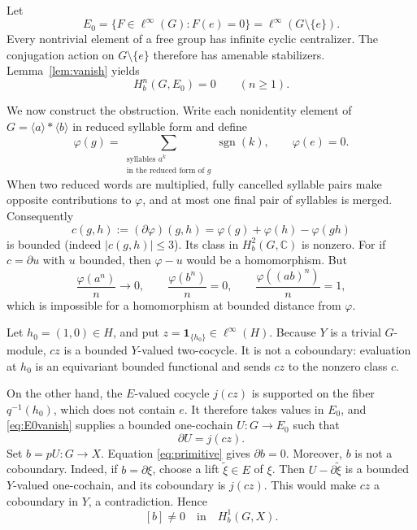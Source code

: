 \documentclass[11pt]{article}
\newcommand{\C}{\mathbb C}
\newcommand{\Hb}{H_{\!b}}
\begin{document}
Let
\[
 E_0=\{F\in\ell^\infty(G):F(e)=0\}
     =\ell^\infty(G\setminus\{e\}).
\]
Every nontrivial element of a free group has infinite cyclic centralizer.
The conjugation action on \(G\setminus\{e\}\) therefore has amenable
stabilizers.  Lemma~\ref{lem:vanish} yields
\begin{equation}\label{eq:E0vanish}
 \Hb^n(G,E_0)=0\qquad(n\ge1).
\end{equation}

We now construct the obstruction.  Write each nonidentity element of
\(G=\langle a\rangle*\langle b\rangle\) in reduced syllable form and define
\[
 \varphi(g)=\sum_{\substack{\text{syllables }a^k\\\text{in the reduced form of }g}}
                  \operatorname{sgn}(k),
 \qquad \varphi(e)=0.
\]
When two reduced words are multiplied, fully cancelled syllable pairs make
opposite contributions to \(\varphi\), and at most one final pair of syllables
is merged.  Consequently
\[
 c(g,h):=(\partial\varphi)(g,h)
 =\varphi(g)+\varphi(h)-\varphi(gh)
\]
is bounded (indeed \(|c(g,h)|\le3\)).  Its class in \(\Hb^2(G,\C)\) is
nonzero.  For if \(c=\partial u\) with \(u\) bounded, then
\(\varphi-u\) would be a homomorphism.  But
\[
 \frac{\varphi(a^n)}n\to0,\qquad
 \frac{\varphi(b^n)}n=0,
 \qquad
 \frac{\varphi((ab)^n)}n=1,
\]
which is impossible for a homomorphism at bounded distance from \(\varphi\).

Let \(h_0=(1,0)\in H\), and put \(z=\mathbf1_{\{h_0\}}\in\ell^\infty(H)\).
Because \(Y\) is a trivial \(G\)-module, \(cz\) is a bounded
\(Y\)-valued two-cocycle.  It is not a coboundary: evaluation at \(h_0\) is
an equivariant bounded functional and sends \(cz\) to the nonzero class
\(c\).

On the other hand, the \(E\)-valued cocycle \(j(cz)\) is supported on the
fiber \(q^{-1}(h_0)\), which does not contain \(e\).  It therefore takes values
in \(E_0\), and \eqref{eq:E0vanish} supplies a bounded one-cochain
\(U:G\to E_0\) such that
\begin{equation}\label{eq:primitive}
 \partial U=j(cz).
\end{equation}
Set \(b=pU:G\to X\).  Equation \eqref{eq:primitive} gives
\(\partial b=0\).  Moreover, \(b\) is not a coboundary.  Indeed, if
\(b=\partial\xi\), choose a lift \(\widetilde\xi\in E\) of \(\xi\).  Then
\(U-\partial\widetilde\xi\) is a bounded \(Y\)-valued one-cochain, and its
coboundary is \(j(cz)\).  This would make \(cz\) a coboundary in \(Y\), a
contradiction.  Hence
\begin{equation}\label{eq:nonzero}
 [b]\ne0\quad\text{in}\quad \Hb^1(G,X).
\end{equation}
\end{document}
